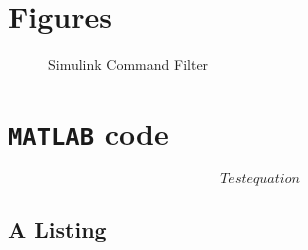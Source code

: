 %


\section{Figures}
\begin{figure}[h!]
	\centering
	\caption{Simulink Command Filter\label{fig:app.CF}}
\end{figure}		

\section{\texttt{MATLAB} code}
\begin{equation}\label{key}
Test equation
\end{equation}
\subsection{A \matlab Listing}

\lstset{language=matlab}


%
%        

%
%
